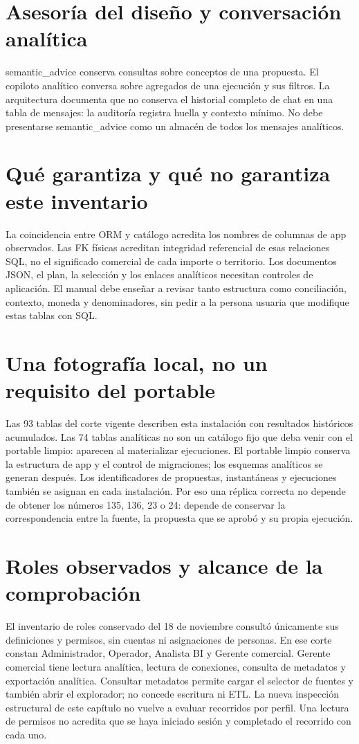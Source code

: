 \section{Asesoría del diseño y conversación analítica}
semantic\_\allowbreak{}advice conserva consultas sobre conceptos de una propuesta. El copiloto analítico conversa sobre agregados de una ejecución y sus filtros. La arquitectura documenta que no conserva el historial completo de chat en una tabla de mensajes: la auditoría registra huella y contexto mínimo. No debe presentarse semantic\_\allowbreak{}advice como un almacén de todos los mensajes analíticos.

\section{Qué garantiza y qué no garantiza este inventario}
La coincidencia entre ORM y catálogo acredita los nombres de columnas de app observados. Las FK físicas acreditan integridad referencial de esas relaciones SQL, no el significado comercial de cada importe o territorio. Los documentos JSON, el plan, la selección y los enlaces analíticos necesitan controles de aplicación. El manual debe enseñar a revisar tanto estructura como conciliación, contexto, moneda y denominadores, sin pedir a la persona usuaria que modifique estas tablas con SQL.

\section{Una fotografía local, no un requisito del portable}
Las 93 tablas del corte vigente describen esta instalación con resultados históricos acumulados. Las 74 tablas analíticas no son un catálogo fijo que deba venir con el portable limpio: aparecen al materializar ejecuciones. El portable limpio conserva la estructura de app y el control de migraciones; los esquemas analíticos se generan después. Los identificadores de propuestas, instantáneas y ejecuciones también se asignan en cada instalación. Por eso una réplica correcta no depende de obtener los números 135, 136, 23 o 24: depende de conservar la correspondencia entre la fuente, la propuesta que se aprobó y su propia ejecución.

\section{Roles observados y alcance de la comprobación}
El inventario de roles conservado del 18 de noviembre consultó únicamente sus definiciones y permisos, sin cuentas ni asignaciones de personas. En ese corte constan Administrador, Operador, Analista BI y Gerente comercial. Gerente comercial tiene lectura analítica, lectura de conexiones, consulta de metadatos y exportación analítica. Consultar metadatos permite cargar el selector de fuentes y también abrir el explorador; no concede escritura ni ETL. La nueva inspección estructural de este capítulo no vuelve a evaluar recorridos por perfil. Una lectura de permisos no acredita que se haya iniciado sesión y completado el recorrido con cada uno.

